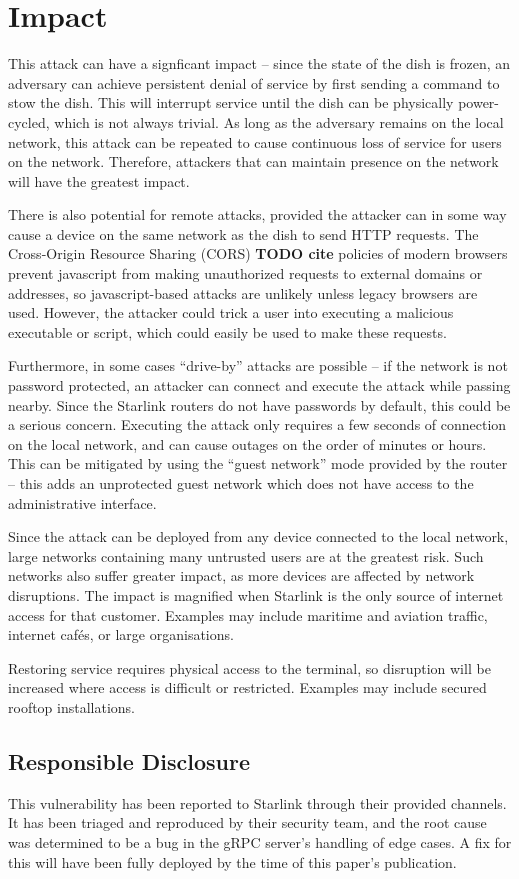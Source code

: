\section{Impact}\label{sec:impact}

This attack can have a signficant impact -- since the state of the dish is frozen, an adversary can achieve persistent denial of service by first sending a command to stow the dish.
This will interrupt service until the dish can be physically power-cycled, which is not always trivial.
As long as the adversary remains on the local network, this attack can be repeated to cause continuous loss of service for users on the network.
Therefore, attackers that can maintain presence on the network will have the greatest impact.

There is also potential for remote attacks, provided the attacker can in some way cause a device on the same network as the dish to send HTTP requests.
The Cross-Origin Resource Sharing (CORS) \textbf{TODO cite} policies of modern browsers prevent javascript from making unauthorized requests to external domains or addresses, so javascript-based attacks are unlikely unless legacy browsers are used.
However, the attacker could trick a user into executing a malicious executable or script, which could easily be used to make these requests.

Furthermore, in some cases ``drive-by'' attacks are possible -- if the network is not password protected, an attacker can connect and execute the attack while passing nearby.
Since the Starlink routers do not have passwords by default, this could be a serious concern.
Executing the attack only requires a few seconds of connection on the local network, and can cause outages on the order of minutes or hours.
This can be mitigated by using the ``guest network'' mode provided by the router -- this adds an unprotected guest network which does not have access to the administrative interface.

Since the attack can be deployed from any device connected to the local network, large networks containing many untrusted users are at the greatest risk.
Such networks also suffer greater impact, as more devices are affected by network disruptions.
The impact is magnified when Starlink is the only source of internet access for that customer.
Examples may include maritime and aviation traffic, internet cafés, or large organisations.

Restoring service requires physical access to the terminal, so disruption will be increased where access is difficult or restricted.
Examples may include secured rooftop installations.


\subsection{Responsible Disclosure}\label{sec:responsible-disclosure}

This vulnerability has been reported to Starlink through their provided channels.
It has been triaged and reproduced by their security team, and the root cause was determined to be a bug in the gRPC server's handling of edge cases.
A fix for this will have been fully deployed by the time of this paper's publication.
